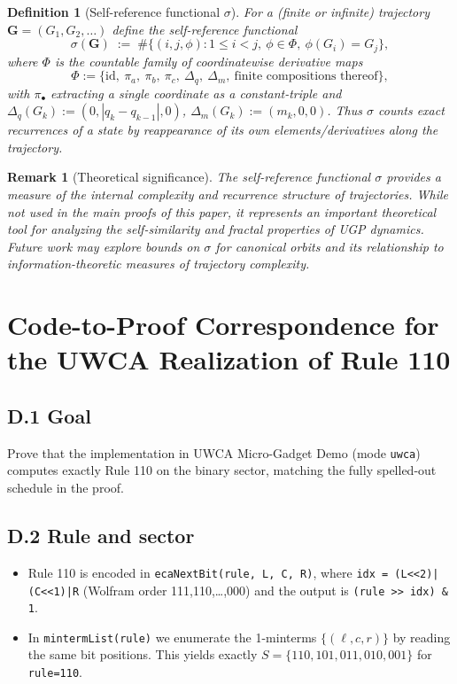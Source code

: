 \documentclass[12pt]{article}
\newtheorem{definition}[theorem]{Definition}
\newtheorem{remark}[theorem]{Remark}
\numberwithin{equation}{section}
\begin{document}
\begin{definition}[Self-reference functional $\sigma$]\label{def:sigma}
For a (finite or infinite) trajectory $\mathbf{G}=(G_1,G_2,\dots)$ define the \emph{self-reference functional}
\[
\sigma(\mathbf{G}) \;:=\; \#\Big\{(i,j,\phi): 1\le i<j,\ \phi\in\Phi,\ \phi(G_i)=G_j \Big\},
\]
where $\Phi$ is the countable family of coordinatewise \emph{derivative maps}
\[
\Phi:=\{\mathrm{id},\ \pi_a,\ \pi_b,\ \pi_c,\ \Delta_q,\ \Delta_m,\ \text{finite compositions thereof}\},
\]
with $\pi_\bullet$ extracting a single coordinate as a constant-triple and $\Delta_q(G_k):=(0,|q_k-q_{k-1}|,0)$, $\Delta_m(G_k):=(m_k,0,0)$. Thus $\sigma$ counts exact recurrences of a state by reappearance of its own elements/derivatives along the trajectory.
\end{definition}

\begin{remark}[Theoretical significance]
The self-reference functional $\sigma$ provides a measure of the internal complexity and recurrence structure of trajectories. While not used in the main proofs of this paper, it represents an important theoretical tool for analyzing the self-similarity and fractal properties of UGP dynamics. Future work may explore bounds on $\sigma$ for canonical orbits and its relationship to information-theoretic measures of trajectory complexity.
\end{remark}

\section{Code-to-Proof Correspondence for the UWCA Realization of Rule 110}\label{app:uwca-proof-code}

\subsection*{D.1  Goal}
Prove that the implementation in UWCA Micro-Gadget Demo (mode \texttt{uwca}) computes exactly Rule 110 on the binary sector, matching the fully spelled-out schedule in the proof.

\subsection*{D.2  Rule and sector}
\begin{itemize}[leftmargin=1.1em]
  \item Rule 110 is encoded in \texttt{ecaNextBit(rule, L, C, R)}, where
  \texttt{idx = (L<<2)|(C<<1)|R} (Wolfram order 111,110,\dots,000) and the output is \texttt{(rule >> idx) \& 1}.
  \item In \texttt{mintermList(rule)} we enumerate the 1-minterms $\{(\ell,c,r)\}$ by reading the same bit positions. This yields exactly
  $S=\{110,101,011,010,001\}$ for \texttt{rule=110}.
\end{itemize}
\end{document}
